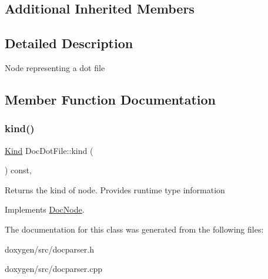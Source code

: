 \subsection*{Additional Inherited Members}


\subsection{Detailed Description}
Node representing a dot file 

\subsection{Member Function Documentation}
\mbox{\label{class_doc_dot_file_ab1d7da6a204174a378805a701641eee4}} 
\subsubsection{\texorpdfstring{kind()}{kind()}}
{\footnotesize\ttfamily \mbox{\hyperlink{class_doc_node_aebd16e89ca590d84cbd40543ea5faadb}{Kind}} Doc\+Dot\+File\+::kind (\begin{DoxyParamCaption}{ }\end{DoxyParamCaption}) const\hspace{0.3cm}{\ttfamily [inline]}, {\ttfamily [virtual]}}

Returns the kind of node. Provides runtime type information 

Implements \mbox{\hyperlink{class_doc_node_a108ffd214a72ba6e93dac084a8f58049}{Doc\+Node}}.



The documentation for this class was generated from the following files\+:\begin{DoxyCompactItemize}
\item 
doxygen/src/docparser.\+h\item 
doxygen/src/docparser.\+cpp\end{DoxyCompactItemize}
